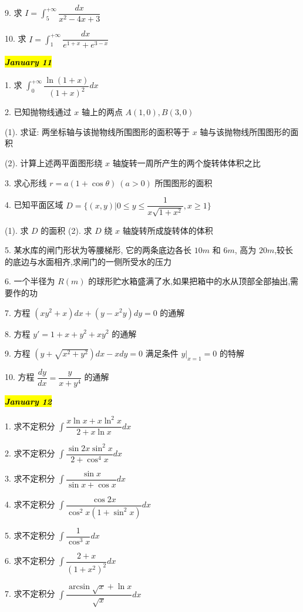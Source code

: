 9. 求 $I=\int_{5}^{+\infty}\dfrac{dx}{x^{2}-4x+3}$

10. 求 $I=\int_{1}^{+\infty}\dfrac{dx}{e^{1+x}+e^{3-x}}$

\hl{\textbf{\textit{January 11}}}

1. 求 $\int_{0}^{+\infty}\dfrac{\ln(1+x)}{(1+x)^{2}}dx$

2. 已知抛物线通过 $x$ 轴上的两点 $A(1,0),B(3,0)$

(1). 求证: 两坐标轴与该抛物线所围图形的面积等于 $x$ 轴与该抛物线所围图形的面积

(2). 计算上述两平面图形绕 $x$ 轴旋转一周所产生的两个旋转体体积之比

3. 求心形线 $r=a(1+\cos\theta)\ (a>0)$ 所围图形的面积

4. 已知平面区域 $D=\{(x,y)|0\leq y\leq \dfrac{1}{x\sqrt{1+x^{2}}},x\geq 1\}$

(1). 求 $D$ 的面积
(2). 求 $D$ 绕 $x$ 轴旋转所成旋转体的体积

5. 某水库的闸门形状为等腰梯形, 它的两条底边各长 $10m$ 和 $6m$, 高为 $20m$,较长的底边与水面相齐,求闸门的一侧所受水的压力

6. 一个半径为 $R(m)$ 的球形贮水箱盛满了水,如果把箱中的水从顶部全部抽出,需要作的功

7. 方程 $(xy^{2}+x)dx+(y-x^{2}y)dy=0$ 的通解

8. 方程 $y'=1+x+y^{2}+xy^{2}$ 的通解

9. 方程 $(y+\sqrt{x^{2}+y^{2}})dx-xdy=0$ 满足条件 $y|_{x=1}=0$ 的特解

10. 方程 $\dfrac{dy}{dx}=\dfrac{y}{x+y^{4}}$ 的通解

\hl{\textbf{\textit{January 12}}}

1. 求不定积分 $\int\dfrac{x\ln x+x\ln^{2}x}{2+x\ln x}dx$

2. 求不定积分 $\int\dfrac{\sin 2x\sin^{2}x}{2+\cos^{4} x}dx$

3. 求不定积分 $\int\dfrac{\sin x}{\sin x+\cos x}dx$

4. 求不定积分 $\int\dfrac{\cos 2x}{\cos^{2} x(1+\sin^{2} x)}dx$

5. 求不定积分 $\int\dfrac{1}{\cos^{3} x}dx$

6. 求不定积分 $\int\dfrac{2+x}{(1+x^{2})^{2}}dx$

7. 求不定积分 $\int\dfrac{\arcsin\sqrt{x}+\ln x}{\sqrt{x}}dx$

